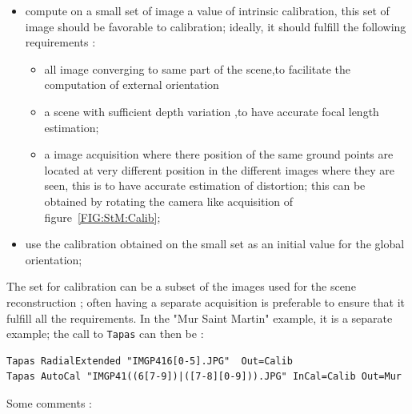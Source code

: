\begin{itemize}
   \item  compute on a small set of image a value of intrinsic calibration,
          this set of image should be favorable to calibration; ideally,
          it should fulfill the following requirements :

\begin{itemize}
  \item  all image converging  to same part of the scene,to facilitate the computation
         of external  orientation

   \item  a scene with sufficient depth variation ,to have accurate focal length estimation;

   \item  a image acquisition where there position of the same ground points are located at
          very different position in the different images where they are seen, this is to
          have accurate estimation of distortion; this can be obtained by rotating the camera
          like acquisition of figure~\ref{FIG:StM:Calib};

\end{itemize}
   \item  use the calibration obtained on the small set as an initial value for
          the global orientation;
\end{itemize}


The set for calibration can be a subset of the images used for the scene
reconstruction ; often having a separate acquisition  is preferable to
ensure that it fulfill all the requirements.
In the "Mur Saint Martin"  example, it is
a separate example;  the call to {\tt Tapas} can then be :


\begin{verbatim}
Tapas RadialExtended "IMGP416[0-5].JPG"  Out=Calib
Tapas AutoCal "IMGP41((6[7-9])|([7-8][0-9])).JPG" InCal=Calib Out=Mur
\end{verbatim}

Some comments :

